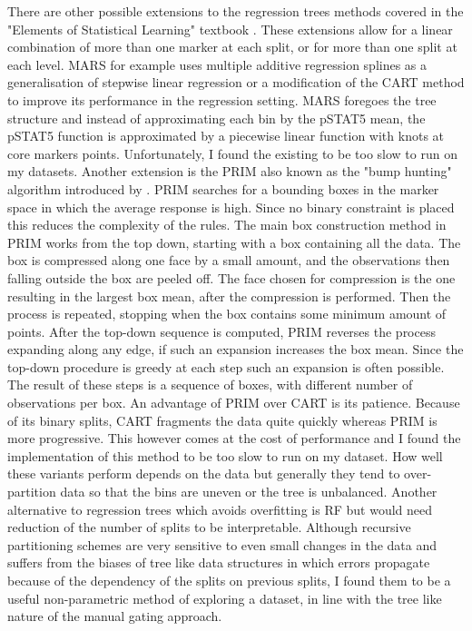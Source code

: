 There are other possible extensions to the regression trees methods covered in the "Elements of Statistical Learning" textbook \citep{Anonymous:ikywRZeA}.
These extensions allow for a linear combination of more than one marker at each split, or for more than one split at each level.
\gls{MARS} for example uses multiple additive regression splines as a generalisation of stepwise linear regression or a modification of the CART method to improve its performance in the regression setting.
\gls{MARS} foregoes the tree structure and instead of approximating each bin by the pSTAT5 mean, the pSTAT5 function is approximated by a piecewise linear function with knots at core markers points.
Unfortunately, I found the existing  to be too slow to run on my datasets.
Another extension is the \gls{PRIM} also known as the "bump hunting" algorithm introduced by \citet{Friedman:1999iy}.
\gls{PRIM} searches for a bounding boxes in the marker space in which the average response is high.
Since no binary constraint is placed this reduces the complexity of the rules.
The main box construction method in PRIM works from the top down, starting with a box containing all the data.
The box is compressed along one face by a small amount, and the observations then falling outside the box are peeled off.
The face chosen for compression is the one resulting in the largest box mean, after the compression is performed.
Then the process is repeated, stopping when the box contains some minimum amount of points.
After the top-down sequence is computed, PRIM reverses the process expanding along any edge, if such an expansion
increases the box mean.
Since the top-down procedure is greedy at each step such an expansion is often possible.
The result of these steps is a sequence of boxes, with different number of observations per box.
An advantage of PRIM over CART is its patience. 
Because of its binary splits, CART fragments the data quite quickly whereas PRIM is more progressive.
This however comes at the cost of performance and I found the  implementation of this method to be too slow to run on my dataset.
%
How well these variants perform depends on the data but generally they tend to over-partition data so that the bins are uneven or the tree is unbalanced.
Another alternative to regression trees which avoids overfitting is \gls{RF} but would need reduction of the number of splits to be interpretable.
Although recursive partitioning schemes are very sensitive to even small changes in the data and suffers from the biases of tree like data structures in which errors propagate because of the dependency of the splits on previous splits,
I found them to be a useful non-parametric method of exploring a dataset, in line with the tree like nature of the manual gating approach.

